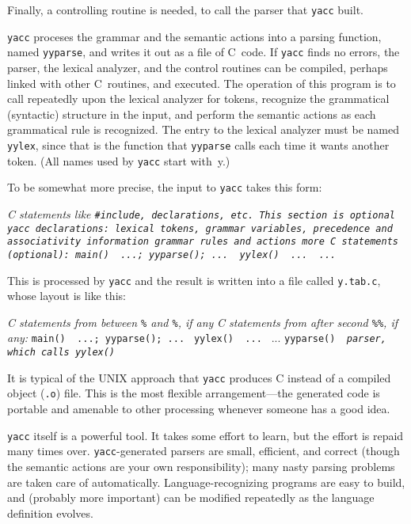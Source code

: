 Finally, a controlling routine is needed, to call the parser
that {\tt yacc} built.

{\tt yacc} proceses the grammar and the semantic actions into
a parsing function, named {\tt yyparse}, and writes it out as
a file of C~code. If {\tt yacc} finds no errors, the parser,
the lexical analyzer, and the control routines can be compiled,
perhaps linked with other C~routines, and executed. The operation
of this program is to call repeatedly upon the lexical analyzer
for tokens, recognize the grammatical (syntactic) structure in the
input, and perform the semantic actions as each grammatical rule
is recognized. The entry to the lexical analyzer must be named
{\tt yylex}, since that is the function that {\tt yyparse} calls
each time it wants another token. (All names used by {\tt yacc}
start with~y.)

To be somewhat more precise, the input to {\tt yacc} takes
this form:

\begincode
\it C statements like \tt#include\it, declarations, etc. This section is optional\tt
\begingroup\it yacc declarations: lexical tokens, grammar variables,
\quad precedence and associativity information\endgroup
\begingroup\it grammar rules and actions\endgroup
\begingroup\it more C statements (optional):\endgroup
main() { ...; yyparse(); ... }
yylex() { ... }
...
\endcode

\noindent
This is processed by {\tt yacc} and the result is written into
a file called {\tt y.tab.c}, whose layout is like this:

\smallbreak
\begingroup
\obeylines
{\it C statements from between {\tt\%\ocb} and {\tt\%\ccb}, if any}
{\it C statements from after second {\tt\%\%}, if any:}
{\tt main() \ocb\ ...; yyparse(); ... \ccb}
{\tt yylex() \ocb\ ... \ccb}
...
{\tt yyparse() \ocb\ \it parser, which calls \tt yylex() \ccb}
\endgroup
\smallskip

It is typical of the {\sc UNIX} approach that {\tt yacc} produces
C instead of a compiled object ({\tt.o}) file. This is the most
flexible arrangement---the generated code is portable and amenable
to other processing whenever someone has a good idea.

{\tt yacc} itself is a powerful tool. It takes some effort to learn,
but the effort is repaid many times over. {\tt yacc}-generated parsers
are small, efficient, and correct (though the semantic actions are
your own responsibility); many nasty parsing problems are taken
care of automatically. Language-recognizing programs are easy
to build, and (probably more important) can be modified repeatedly
as the language definition evolves.

